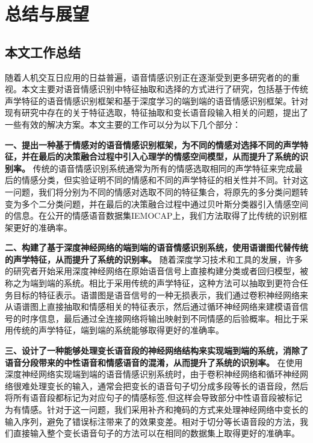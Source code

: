 \chapter{总结与展望}
\label{cha:summary_prospect}

\section{本文工作总结}
\label{sec:summary}

随着人机交互日应用的日益普遍，语音情感识别正在逐渐受到更多研究者的的重视。本文主要对语音情感识别中特征抽取和选择的方式进行了研究，包括基于传统声学特征的语音情感识别框架和基于深度学习的端到端的语音情感识别框架。针对现有研究中存在的关于特征选取，特征抽取和变长语音段输入相关的问题，提出了一些有效的解决方案。本文主要的工作可以分为以下几个部分：

\textbf{一、提出一种基于情感对的语音情感识别框架，为不同的情感对选择不同的声学特征，并在最后的决策融合过程中引入心理学的情感空间模型，从而提升了系统的识别率。} 传统的语音情感识别系统通常为所有的情感选取相同的声学特征来完成最后的情感分类，但实验证明不同的情感和不同的声学特征的相关性并不同。针对这一问题，我们将分别为不同的情感对选取不同的特征集合，将原先的多分类问题转变为多个二分类问题，并在最后的决策融合过程中通过贝叶斯分类器引入情感空间的信息。在公开的情感语音数据集IEMOCAP上，我们方法取得了比传统的识别框架更好的准确率。

\textbf{二、构建了基于深度神经网络的端到端的语音情感识别系统，使用语谱图代替传统的声学特征，从而提升了系统的识别率。} 随着深度学习技术和工具的发展，许多的研究者开始采用深度神经网络在原始语音信号上直接构建分类或者回归模型，被称之为端到端的系统。相比于采用传统的声学特征，这种方法可以抽取到更符合任务目标的特征表示。语谱图是语音信号的一种无损表示，我们通过卷积神经网络来从语谱图上直接抽取和情感相关的特征表示，然后通过循环神经网络来建模语音信号的时序信息，最后通过全连接网络将输出映射到不同情感的后验概率。相比于采用传统的声学特征，端到端的系统能够取得更好的准确率。

\textbf{三、设计了一种能够处理变长语音段的神经网络结构来实现端到端的系统，消除了语音分段带来的中性语音和情感语音的混淆，从而提升了系统的识别率。} 在使用深度神经网络实现端到端的语音情感识别系统时，由于卷积神经网络和循环神经网络很难处理变长的输入，通常会把变长的语音句子切分成多段等长的语音段，然后将所有语音段都标记为对应句子的情感标签,但这样会导致部分中性语音段被标记为有情感。针对于这一问题，我们采用补齐和掩码的方式来处理神经网络中变长的输入序列，避免了错误标注带来了的效果变差。相对于切分等长语音段的方法，我们直接输入整个变长语音句子的方法可以在相同的数据集上取得更好的准确率。

